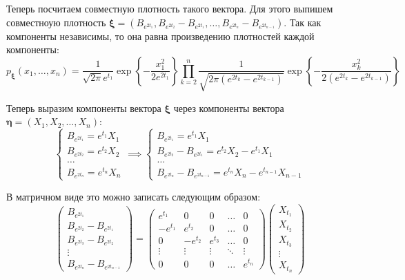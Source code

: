 Теперь посчитаем совместную плотность такого вектора. Для этого выпишем 
совместноую плотность \(\bm{\xi} = (B_{e^{2t_{1}}}, B_{e^{2t_{2}}} - 
B_{e^{2t_{1}}}, \ldots, B_{e^{2t_{n}}} - B_{e^{2t_{n - 1}}})\). Так как 
компоненты независимы, то она равна произведению плотностей каждой компоненты:
\[
	p_{\bm{\xi}}(x_{1}, \dots, x_{n}) = \frac{1}{\sqrt{2\pi}e^{t_{1}}} 
	\exp\left\{-\frac{x_{1}^{2}}{2e^{2t_{1}}}\right\}\prod_{k = 2}^{n} 
	\frac{1}{\sqrt{2\pi(e^{2t_{k}} - e^{2t_{k - 1}})}} 
	\exp\left\{-\frac{x_{k}^{2}}{2(e^{2t_{k}} - e^{2t_{k - 1}})}\right\}
\]

Теперь выразим компоненты вектора \(\bm{\xi}\) через компоненты вектора 
\(\bm{\eta} = (X_{1}, X_{2}, \ldots, X_{n})\):
\[
	\begin{cases}
	B_{e^{2t_{1}}} = e^{t_{1}}X_{1} \\
	B_{e^{2t_{2}}} = e^{t_{2}}X_{2} \\
	\dots \\
	B_{e^{2t_{n}}} = e^{t_{n}}X_{n}
	\end{cases}
	\implies 
	\begin{cases}
	B_{e^{2t_{1}}} = e^{t_{1}}X_{1} \\
	B_{e^{2t_{2}}} - B_{e^{2t_{1}}} = e^{t_{2}}X_{2} - e^{t_{1}}X_{1} \\
	\dots \\
	B_{e^{2t_{n}}} - B_{e^{2t_{n - 1}}} = e^{t_{n}}X_{n} - e^{t_{n - 1}}X_{n - 
	1}
	\end{cases}
\]

В матричном виде это можно записать следующим образом:
\[
	\begin{pmatrix}
	B_{e^{2t_{1}}} \\ B_{e^{2t_{2}}} - B_{e^{2t_{1}}} \\ B_{e^{2t_{3}}} - 
	B_{e^{2t_{2}}} \\ \vdots \\ B_{e^{2t_{n}}} - B_{e^{2t_{n - 1}}}
	\end{pmatrix}
	=
	\begin{pmatrix}
	e^{t_{1}} & 0 & 0 & \ldots & 0 \\
	-e^{t_{1}} & e^{t_{2}} & 0 & \ldots & 0 \\
	0 & -e^{t_{2}} & e^{t_{3}} & \ldots & 0 \\
	\vdots & \vdots & \vdots & \ddots & \vdots \\
	0 & 0 & 0 & \ldots & e^{t_{n}}
	\end{pmatrix}
	\begin{pmatrix}
	X_{t_{1}} \\ X_{t_{2}} \\ X_{t_{3}} \\ \vdots \\ X_{t_{n}}
	\end{pmatrix}
\]


